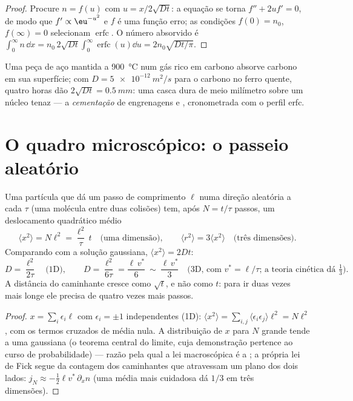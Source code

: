 \begin{proof}
Procure $n = f(u)$ com $u = x/2\sqrt{Dt}$: a equação se torna
$f'' + 2uf' = 0$, de modo que $f' \propto \eu^{-u^2}$ e $f$ é uma função
erro; as condições $f(0) = n_0$, $f(\infty) = 0$ selecionam
$\operatorname{erfc}$. O número absorvido é $\int_0^\infty n\,\dd x =
n_0\,2\sqrt{Dt}\int_0^\infty\operatorname{erfc}(u)\dd u = 2n_0\sqrt{Dt/\pi}$.
\end{proof}

\begin{example}\label{ex:b2:particle-diffusion:carburising}
Uma peça de aço mantida a \qty{900}{\celsius} num gás rico em carbono absorve
carbono em sua superfície; com $D = \qty{5e-12}{m^2/s}$ para o carbono no ferro
quente, quatro horas dão $2\sqrt{Dt} = \qty{0.5}{mm}$: uma casca dura de meio
milímetro sobre um núcleo tenaz --- a \emph{cementação} de engrenagens e
, cronometrada com o perfil erfc.
\end{example}

\section{O quadro microscópico: o passeio aleatório}\label{sec:b2:particle-diffusion:microscopic}

\begin{proposition}\label{prop:b2:particle-diffusion:walk}
Uma partícula que dá um passo de comprimento $\ell$ numa direção aleatória
a cada $\tau$ (uma molécula entre duas colisões) tem, após $N =
t/\tau$ passos, um deslocamento quadrático médio
\[
\langle x^2\rangle = N\ell^2 = \frac{\ell^2}{\tau}\,t
\quad\text{(uma dimensão)}, \qquad
\langle r^2\rangle = 3\langle x^2\rangle \quad\text{(três dimensões)}.
\]
Comparando com a solução gaussiana, $\langle x^2\rangle = 2Dt$:
\[
D = \frac{\ell^2}{2\tau} \quad\text{(1D)}, \qquad
D = \frac{\ell^2}{6\tau} = \frac{\ell\,v^*}{6}\ \sim\ \frac{\ell\,v^*}{3}
\quad\text{(3D, com } v^* = \ell/\tau\text{; a teoria cinética dá } \tfrac13) .
\]
A distância do caminhante cresce como $\sqrt t$, e não como $t$: para ir duas vezes mais longe
ele precisa de quatro vezes mais passos.
\end{proposition}

\begin{proof}
$x = \sum_i \epsilon_i\ell$ com $\epsilon_i = \pm1$ independentes (1D):
$\langle x^2\rangle = \sum_{i,j}\langle\epsilon_i\epsilon_j\rangle\ell^2 =
N\ell^2$, com os termos cruzados de média nula. A distribuição de $x$
para $N$ grande tende a uma gaussiana (o teorema central do limite, cuja
demonstração pertence ao curso de probabilidade) --- razão pela qual a
lei macroscópica é a ; a própria lei de Fick segue
da contagem dos caminhantes que atravessam um plano dos dois lados: $j_N \approx
-\tfrac12\ell v^*\,\partial_x n$ (uma média mais cuidadosa dá $1/3$ em
três dimensões).
\end{proof}

